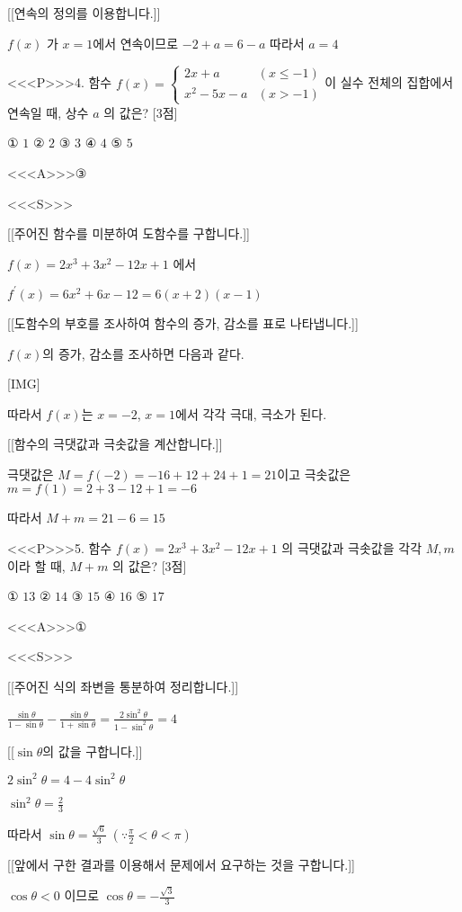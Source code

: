 \documentclass{oblivoir}
\begin{document}
[[연속의 정의를 이용합니다.]]

$f(x)$ 가 $x=1$에서 연속이므로 $-2+a=6-a$
따라서 $a=4$


<<<P>>>4. 함수 $f(x)= \begin{cases}2 x+a & (x \leq-1) \\ x^{2}-5 x-a & (x>-1)\end{cases}$이 실수 전체의 집합에서 연속일 때, 상수 $a$ 의 값은? [3점]

① $1$
② $2$
③ $3$
④ $4$
⑤ $5$


<<<A>>>③

<<<S>>>

[[주어진 함수를 미분하여 도함수를 구합니다.]]

$f(x)=2 x^{3}+3 x^{2}-12 x+1$ 에서

$f^{\prime}(x)=6 x^{2}+6 x-12=6(x+2)(x-1)$

[[도함수의 부호를 조사하여 함수의 증가, 감소를 표로 나타냅니다.]]

$f(x)$의 증가, 감소를 조사하면 다음과 같다.

[IMG]

따라서 $f(x)$는 $x=-2$, $x=1$에서 각각 극대, 극소가 된다.

[[함수의 극댓값과 극솟값을 계산합니다.]]

극댓값은 $M=f(-2)=-16+12+24+1=21$이고
극솟값은 $m=f(1)=2+3-12+1=-6$

따라서 $M+m=21-6=15$


<<<P>>>5. 함수 $f(x)=2 x^{3}+3 x^{2}-12 x+1$ 의 극댓값과 극솟값을 각각 $M, m$ 이라 할 때, $M+m$ 의 값은? [3점]

① $13$
② $14$
③ $15$
④ $16$
⑤ $17$

<<<A>>>①

<<<S>>>

[[주어진 식의 좌변을 통분하여 정리합니다.]]

$ \frac{\sin \theta}{1-\sin \theta}-\frac{\sin \theta}{1+\sin \theta}=\frac{2 \sin ^{2} \theta}{1-\sin ^{2} \theta}=4$

[[$\sin \theta$의 값을 구합니다.]]

$2 \sin ^{2} \theta=4-4 \sin ^{2} \theta$

$\sin ^{2} \theta=\frac{2}{3}$

따라서 $\sin \theta=\frac{\sqrt{6}}{3}\;\left(\because \frac{\pi}{2}<\theta<\pi\right)$

[[앞에서 구한 결과를 이용해서 문제에서 요구하는 것을 구합니다.]]

$\cos \theta<0$ 이므로 $\cos \theta=-\frac{\sqrt{3}}{3}$
\end{document}
